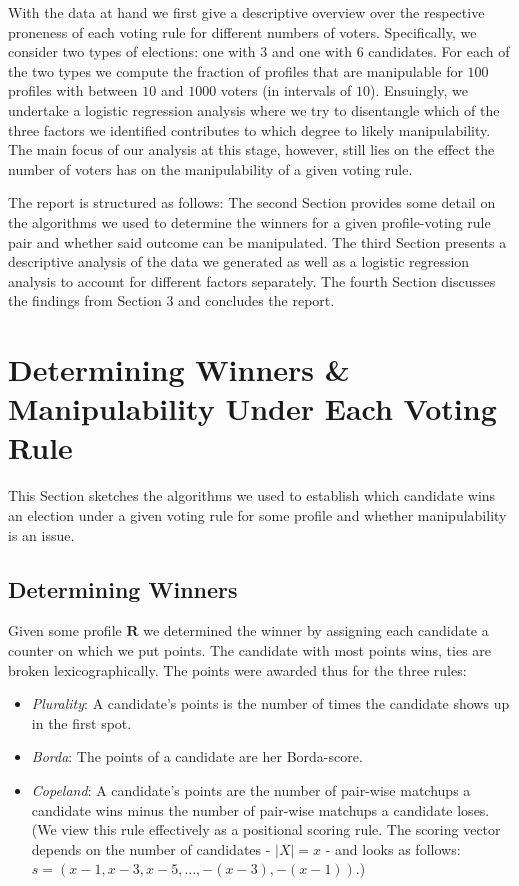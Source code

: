 \documentclass[10pt,a4paper]{article}
\begin{document}
With the data at hand we first give a descriptive overview over the respective proneness of each voting rule for different numbers of voters. Specifically, we consider two types of elections: one with $3$ and one with $6$ candidates. For each of the two types we compute the fraction of profiles that are manipulable for $100$ profiles with between $10$ and $1000$ voters (in intervals of $10$). Ensuingly, we undertake a logistic regression analysis where we try to disentangle which of the three factors we identified contributes to which degree to likely manipulability. The main focus of our analysis at this stage, however, still lies on the effect the number of voters has on the manipulability of a given voting rule.

The report is structured as follows: The second Section provides some detail on the algorithms we used to determine the winners for a given profile-voting rule pair and whether said outcome can be manipulated. The third Section presents a descriptive analysis of the data we generated as well as a logistic regression analysis to account for different factors separately. The fourth Section discusses the findings from Section 3 and concludes the report.
\section{Determining Winners \& Manipulability Under Each Voting Rule}
This Section sketches the algorithms we used to establish which candidate wins an election under a given voting rule for some profile and whether manipulability is an issue.
\subsection{Determining Winners}
Given some profile $\mathbf{R}$ we determined the winner by assigning each candidate a counter on which we put points. The candidate with most points wins, ties are broken lexicographically. The points were awarded thus for the three rules:
\begin{itemize}
\item \textit{Plurality}: A candidate's points is the number of times the candidate shows up in the first spot.
\item \textit{Borda}: The points of a candidate are her Borda-score.
\item \textit{Copeland}: A candidate's points are the number of pair-wise matchups a candidate wins minus the number of pair-wise matchups a candidate loses. (We view this rule effectively as a positional scoring rule. The scoring vector depends on the number of candidates - $|X|=x$ - and looks as follows: $s=(x-1, x-3, x-5, ..., -(x-3), -(x-1))$.)
\end{itemize}
\end{document}
